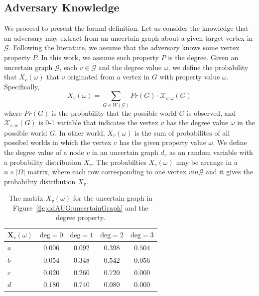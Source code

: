 \subsection{Adversary Knowledge}
We proceed to present the formal definition. Let us consider the knowledge that an adversary may extract from an uncertain graph about a given target vertex in $\mathcal{G}$. Following the literature, we assume that the adversary knows some vertex property $P$. In this work, we assume such property $P$ is the degree. Given an uncertain graph $\mathcal{G}$, each $v \in \mathcal{G}$ and the degree value $\omega$, we define the probability that $X_{v}(\omega)$ that $v$ originated from a vertex in $G$ with property value $\omega$. Specifically, 
\begin{equation*}
    X_{v}(\omega) = \sum_{G \in W(\mathcal{G})}  Pr(G) \cdot \mathcal{X}_{v,\omega}(G)
\end{equation*}
where $Pr(G)$ is the probability that the possible world $G$ is observed, and $\mathcal{X}_{v,w}(G)$ is 0-1 variable that indicates the vertex $v$ has the degree value $\omega$ in the possible world $G$. In other world, $X_{v}(\omega)$ is the sum of probabilites of all possibel worlds in which the vertex $v$ has the given property value $\omega$. We define the degree value of a node $v$ in an uncertain graph $d_{v}$ as an random variable with a probability distribution $X_{v}$. The probabilties $X_{v}(\omega)$ may be arrange in a $n \times |\Omega|$ matrix, where each row corresponding to one vertex $v in \mathcal{G}$ and it gives the probability distribution $X_{v}$. 
 \begin{table}[t!]
     \centering
      \begin{tabular}{|L{1.25cm}|c|c|c|c|}
                $\mathbf{X}_{v}(\omega)$ & $\text{deg}=0$ & $\text{deg}=1$ & $\text{deg}=2$ & $\text{deg}=3$ \\ \hline 
              $a$   & $0.006$ & $0.092$ & $0.398$ & $0.504$ \\ 
              $b$   & $0.054$ & $0.348$ & $0.542$ & $0.056$  \\
              $c$   & $0.020$ & $0.260$ & $0.720$ & $0.000$ \\
              $d$   & $0.180$ & $0.740$ & $0.080$ & $0.000$  \\  \hline 
      \end{tabular} 
      \caption{The matrix $X_{v}(\omega)$ for the uncertain graph in Figure~\ref{fig:ddAUG:uncertainGraph} and the degree property.}
     \label{tab:DegreeMatrix}
 \end{table}


